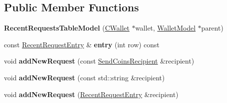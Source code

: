 \subsection*{Public Member Functions}
\begin{DoxyCompactItemize}
\item 
\mbox{\label{class_recent_requests_table_model_ab3ef691b8c34e6d6e5ae0bdf7953a360}} 
{\bfseries Recent\+Requests\+Table\+Model} (\mbox{\hyperlink{class_c_wallet}{C\+Wallet}} $\ast$wallet, \mbox{\hyperlink{class_wallet_model}{Wallet\+Model}} $\ast$parent)
\item 
\mbox{\label{class_recent_requests_table_model_a6d0dead09080f7f8201a3feff0c30bb7}} 
const \mbox{\hyperlink{class_recent_request_entry}{Recent\+Request\+Entry}} \& {\bfseries entry} (int row) const
\item 
\mbox{\label{class_recent_requests_table_model_ae9866ffd5aed0f041437996410928edd}} 
void {\bfseries add\+New\+Request} (const \mbox{\hyperlink{class_send_coins_recipient}{Send\+Coins\+Recipient}} \&recipient)
\item 
\mbox{\label{class_recent_requests_table_model_aad0b9435284ed1f4b67852b34d7694a9}} 
void {\bfseries add\+New\+Request} (const std\+::string \&recipient)
\item 
\mbox{\label{class_recent_requests_table_model_a740761ab9075472df23be66d0a52f141}} 
void {\bfseries add\+New\+Request} (\mbox{\hyperlink{class_recent_request_entry}{Recent\+Request\+Entry}} \&recipient)
\end{DoxyCompactItemize}
